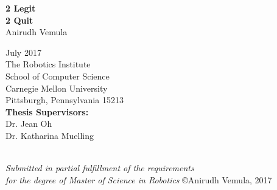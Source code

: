 \thispagestyle{empty}
\date{}

\begin{center}

{\Huge \bf 2 Legit \\ 2 Quit} \\
\vspace{1cm}  
{\Large Anirudh Vemula} \\
\vspace{1cm} 


{\Large July 2017} \\
\vspace{2cm}
{\Large
  The Robotics Institute\\
  School of Computer Science \\
  Carnegie Mellon University\\
  Pittsburgh, Pennsylvania 15213\\
}
\vspace{1cm}
{\Large
{\bf Thesis Supervisors:}\\
Dr. Jean Oh\\
Dr. Katharina Muelling
}
\vspace{2cm}
\par ~ \\
{\large \it Submitted in partial fulfillment of the requirements \\for the degree of Master of Science in Robotics}
\vfill
{\large \copyright Anirudh Vemula, 2017}
\end{center}



